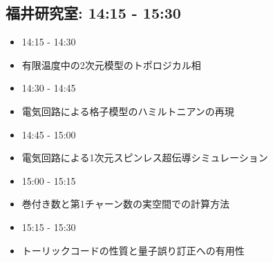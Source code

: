 \documentclass[a4paper,14pt]{jsarticle}
\begin{document}
\subsection*{\textsf{福井研究室: 14:15 - 15:30}}
\begin{itemize}[label={},leftmargin=*]
    \item \textsf{14:15 - 14:30}  
    \item \quad \textsf{有限温度中の2次元模型のトポロジカル相}
    \item \textsf{14:30 - 14:45}   
    \item \quad \textsf{電気回路による格子模型のハミルトニアンの再現}
    \item \textsf{14:45 - 15:00}  
    \item \quad \textsf{電気回路による1次元スピンレス超伝導シミュレーション}
    \item \textsf{15:00 - 15:15}  
    \item \quad \textsf{巻付き数と第1チャーン数の実空間での計算方法}
    \item \textsf{15:15 - 15:30}   
    \item \quad \textsf{トーリックコードの性質と量子誤り訂正への有用性}
\end{itemize}
\end{document}
